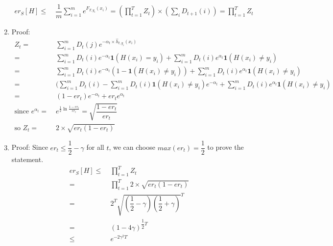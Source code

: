 \documentclass[english]{article}
\begin{document}
\begin{enumerate}
\begin{align*}
    er_S[H] \leq &\; \dfrac{1}{m}\sum_{i=1}^{m} e^{F_{T, y_i}(x_i)} = (\prod_{t=1}^{T}Z_t)\times(\sum_{i}D_{t+1}(i)) = \prod_{t=1}^{T}Z_t
    \end{align*}
    \clearpage
    \item Proof:
    \begin{align*}
    Z_t = &\; \sum_{i=1}^{m}D_t(j)e^{-\alpha_t\times \hat{h}_{t, y_i}(x_i)}\\
    = &\; \sum_{i=1}^{m}D_t(i)e^{-\alpha_t}\mathbf{1}(H(x_i)=y_i) + \sum_{i=1}^{m}D_t(i)e^{\alpha_t}\mathbf{1}(H(x_i)\neq y_i)\\
    = &\; \sum_{i=1}^{m}D_t(i)e^{-\alpha_t}(1-\mathbf{1}(H(x_i)\neq y_i)) + \sum_{i=1}^{m}D_t(i)e^{\alpha_t}\mathbf{1}(H(x_i)\neq y_i)\\
    = &\; (\sum_{i=1}^{m}D_t(i)-\sum_{i=1}^{m}D_t(i)\mathbf{1}(H(x_i)\neq y_i)e^{-\alpha_t} +\sum_{i=1}^{m}D_t(i)e^{\alpha_t}\mathbf{1}(H(x_i)\neq y_i)\\
    = &\; (1-er_t)e^{-\alpha_t}+er_t e^{\alpha_t}\\
    \text{since }e^{\alpha_t} = &\; e^{\frac{1}{2}\ln{\frac{1-er_t}{er_t}}} = \sqrt{\dfrac{1-er_t}{er_t}}\\
    \text{so } Z_t = &\; 2 \times \sqrt{er_t(1-er_t)}
    \end{align*}
    \clearpage
    \item Proof:
    Since $er_t \leq \dfrac{1}{2} - \gamma$ for all $t$, we can choose $max(er_t) = \dfrac{1}{2}$ to prove the statement.
    \begin{align*}
    er_S [H] \leq &\; \prod_{t=1}^{T}Z_t\\
    = &\; \prod_{t=1}^{T} 2 \times \sqrt{er_t(1-er_t)}\\
    = &\; 2^T \sqrt{(\dfrac{1}{2}-\gamma)(\dfrac{1}{2}+\gamma)}^T\\
    = &\; (1-4\gamma)^{\dfrac{1}{2}T}\\
    \leq &\; e^{-2\gamma^2T}
    \end{align*}
\end{enumerate}
\clearpage
\end{document}
